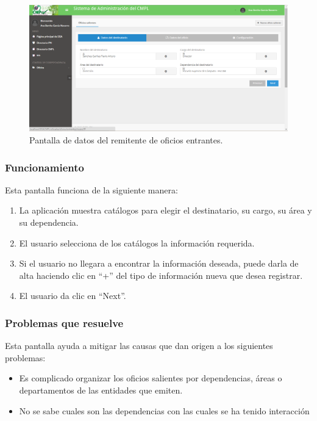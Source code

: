 	\begin{figure}[htbp!]
		\centering
			\includegraphics[width=1\textwidth]{Pantallas/Wizard1DatosDelDestinatario.png}
		\caption{Pantalla de datos del remitente de oficios entrantes.}
		\label{fig:Wizard1DatosDelDestinatario}
	\end{figure}

\subsubsection{Funcionamiento}
	Esta pantalla funciona de la siguiente manera:
	
	\begin{enumerate}
		\item La aplicación muestra catálogos para elegir el destinatario, su cargo, su área y su dependencia.
		\item El usuario selecciona de los catálogos la información requerida.
		\item Si el usuario no llegara a encontrar la información deseada, puede darla de alta haciendo clic en ``+'' del tipo de información nueva que desea registrar.
		\item El usuario da clic en ``Next''.
	\end{enumerate}

\subsubsection{Problemas que resuelve}
Esta pantalla ayuda a mitigar las causas que dan origen a los siguientes problemas:

	\begin{itemize}
		\item Es complicado organizar los oficios salientes por dependencias, áreas o departamentos de las entidades que emiten.
		\item No se sabe cuales son las dependencias con las cuales se ha tenido interacción
	\end{itemize}

